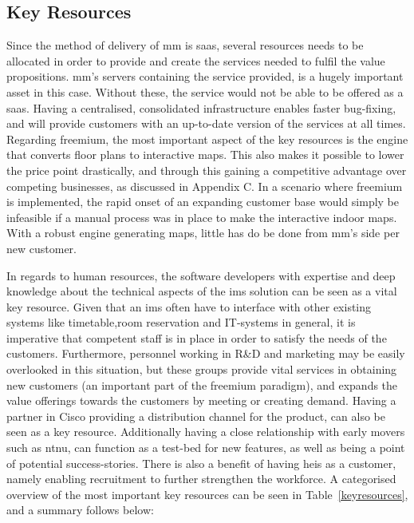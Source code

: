 \subsection{Key Resources}
Since the method of delivery of \gls{mm} is \gls{saas}, several resources needs to be allocated in order to provide and create the services needed to fulfil the value propositions. \gls{mm}'s servers containing the service provided, is a hugely important asset in this case. Without these, the service would not be able to be offered as a \gls{saas}. Having a centralised, consolidated infrastructure enables faster bug-fixing, and will provide customers with an up-to-date version of the services at all times. Regarding freemium, the most important aspect of the key resources is the engine that converts floor plans to interactive maps. This also makes it possible to lower the price point drastically, and through this gaining a competitive advantage over competing businesses, as discussed in Appendix C. In a scenario where freemium is implemented, the rapid onset of an expanding customer base would simply be infeasible if a manual process was in place to make the interactive indoor maps. With a robust engine generating maps, little has do be done from \gls{mm}'s side per new customer.


In regards to human resources, the software developers with expertise and deep knowledge about the technical aspects of the \gls{ims} solution can be seen as a vital key resource. Given that an \gls{ims} often have to interface with other existing systems like timetable,room reservation and IT-systems in general, it is imperative that competent staff is in place in order to satisfy the needs of the customers. Furthermore, personnel working in R\&D and marketing may be easily overlooked in this situation, but these groups provide vital services in obtaining new customers (an important part of the freemium paradigm), and expands the value offerings towards the customers by meeting or creating demand. Having a partner in Cisco providing a distribution channel for the product, can also be seen as a key resource. Additionally having a close relationship with early movers such as \gls{ntnu}, can function as a test-bed for new features, as well as being a point of potential success-stories. There is also a benefit of having \glspl{hei} as a customer, namely enabling recruitment to further strengthen the workforce. A categorised overview of the most important key resources can be seen in Table~\ref{keyresources}, and a summary follows below:

